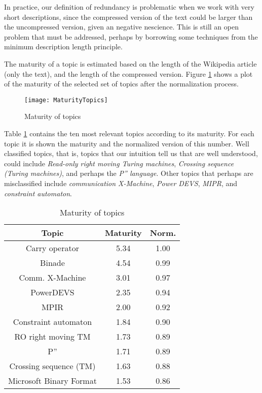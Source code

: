 In practice, our definition of redundancy is problematic when we work with very short descriptions, since the compressed version of the text could be larger than the uncompressed version, given an negative nescience. This is still an open problem that must be addressed, perhaps by borrowing some techniques from the minimum description length principle.

The maturity of a topic is estimated based on the length of the Wikipedia article (only the text), and the length of the compressed version. Figure \ref{fig:Maturity-of-Topics} shows a plot of the maturity of the selected set of topics after the normalization process.

\begin{figure}[h]
\centering\texttt{[image: MaturityTopics]}
\caption{\label{fig:Maturity-of-Topics}Maturity of topics}
\end{figure}

Table \ref{tab:Maturity-of-Topics} contains the ten most relevant topics according to its maturity. For each topic it is shown the maturity and the normalized version of this number. Well classified topics, that is, topics that our intuition tell us that are well understood, could include \emph{Read-only right moving Turing machines}, \emph{Crossing sequence (Turing machines)}, and perhaps the \emph{P'' language}. Other topics that perhaps are misclassified include \emph{communication X-Machine}, \emph{Power DEVS}, \emph{MIPR}, and \emph{constraint automaton}.

\begin{table}
\begin{centering}
\begin{tabular}{|c|c|c|}
\hline 
Topic & Maturity & Norm.\tabularnewline
\hline 
\hline 
Carry operator & 5.34 & 1.00\tabularnewline
\hline 
Binade & 4.54 & 0.99\tabularnewline
\hline 
Comm. X-Machine & 3.01 & 0.97\tabularnewline
\hline 
PowerDEVS & 2.35 & 0.94\tabularnewline
\hline 
MPIR & 2.00 & 0.92\tabularnewline
\hline 
Constraint automaton & 1.84 & 0.90\tabularnewline
\hline 
RO right moving TM & 1.73 & 0.89\tabularnewline
\hline 
P'' & 1.71 & 0.89\tabularnewline
\hline 
Crossing sequence (TM) & 1.63 & 0.88\tabularnewline
\hline 
Microsoft Binary Format & 1.53 & 0.86\tabularnewline
\hline 
\end{tabular}
\par\end{centering}

\caption{\label{tab:Maturity-of-Topics}Maturity of topics}
\end{table}


